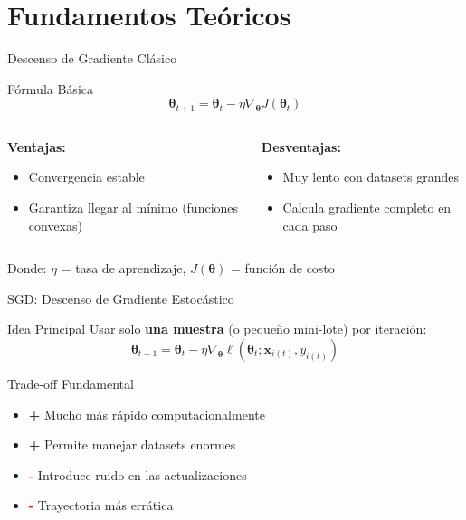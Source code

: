 \documentclass[10pt]{beamer}
\begin{document}
\section{Fundamentos Teóricos}

\begin{frame}{Descenso de Gradiente Clásico}
\begin{block}{Fórmula Básica}
$$\boldsymbol{\theta}_{t+1} = \boldsymbol{\theta}_t - \eta \nabla_{\boldsymbol{\theta}} J(\boldsymbol{\theta}_t)$$
\end{block}

\begin{columns}
\begin{column}{0.5\textwidth}
\textbf{Ventajas:}
\begin{itemize}
\item Convergencia estable
\item Garantiza llegar al mínimo (funciones convexas)
\end{itemize}
\end{column}
\begin{column}{0.5\textwidth}
\textbf{Desventajas:}
\begin{itemize}
\item Muy lento con datasets grandes
\item Calcula gradiente completo en cada paso
\end{itemize}
\end{column}
\end{columns}

\vspace{0.5cm}
Donde: $\eta$ = tasa de aprendizaje, $J(\boldsymbol{\theta})$ = función de costo
\end{frame}

\begin{frame}{SGD: Descenso de Gradiente Estocástico}
\begin{block}{Idea Principal}
Usar solo \textbf{una muestra} (o pequeño mini-lote) por iteración:
$$\boldsymbol{\theta}_{t+1} = \boldsymbol{\theta}_t - \eta \nabla_{\boldsymbol{\theta}} \ell(\boldsymbol{\theta}_t; \mathbf{x}_{i(t)}, y_{i(t)})$$
\end{block}

\begin{alertblock}{Trade-off Fundamental}
\begin{itemize}
\item \textcolor{verdeClaro}{\textbf{+}} Mucho más rápido computacionalmente
\item \textcolor{verdeClaro}{\textbf{+}} Permite manejar datasets enormes
\item \textcolor{red}{\textbf{-}} Introduce ruido en las actualizaciones
\item \textcolor{red}{\textbf{-}} Trayectoria más errática
\end{itemize}
\end{alertblock}
\end{frame}
\end{document}
